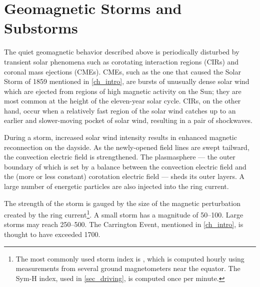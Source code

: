 
\section{Geomagnetic Storms and Substorms}
  \label{sec_storms}

The quiet geomagnetic behavior described above is periodically disturbed by
transient solar phenomena such as corotating interaction regions (CIRs) and
coronal mass ejections (CMEs). CMEs, such as the one that caused the Solar
Storm of 1859 mentioned in \cref{ch_intro}, are bursts of unusually dense solar
wind which are ejected from regions of high magnetic activity on the Sun; they
are most common at the height of the eleven-year solar cycle. CIRs, on the
other hand, occur when a relatively fast region of the solar wind catches up to
an earlier and slower-moving pocket of solar wind, resulting in a pair of
shockwaves. 

During a storm, increased solar wind intensity results in enhanced magnetic
reconnection on the dayside. As the newly-opened field lines are swept
tailward, the convection electric field is strengthened. The plasmasphere ---
the outer boundary of which is set by a balance between the convection electric
field and the (more or less constant) corotation electric field --- sheds its
outer layers\cite{goldstein_2006}. A large number of energetic particles are
also injected into the ring current\cite{mcpherron_1997}. 

The strength of the storm is gauged by the size of the magnetic perturbation
created by the ring current\footnote{The most commonly used storm index is
\DST, which is computed hourly using measurements from several ground
magnetometers near the equator. The Sym-H index, used in \cref{sec_driving}, is
computed once per minute. }. A small storm has a magnitude of
\SIrange{50}{100}{\nT}. Large storms may reach \SIrange{250}{500}{\nT}. The
Carrington Event, mentioned in \cref{ch_intro}, is thought to have exceeded
\SI{1700}{\nT}\cite{tsurutani_2003}. 

